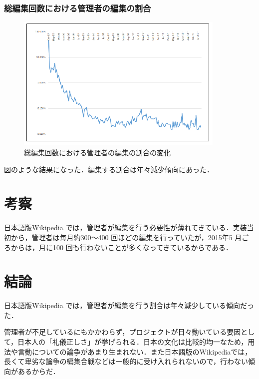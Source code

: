 \subsection{総編集回数における管理者の編集の割合}


\begin{figure}[H]
\centering
\includegraphics[width=10cm]{sysop_per.png}
\caption{総編集回数における管理者の編集の割合の変化}\label{サンプル図}
\end{figure}

図のような結果になった．編集する割合は年々減少傾向にあった．








\chapter{考察}

日本語版Wikipedia では，管理者が編集を行う必要性が薄れてきている．実装当初から，管理者は毎月約300～400 回ほどの編集を行っていたが，2015年5 月ごろからは，月に100 回も行わないことが多くなってきているからである．


\chapter{結論}

日本語版Wikipedia では，管理者が編集を行う割合は年々減少している傾向だった．

管理者が不足しているにもかかわらず，プロジェクトが日々動いている要因として，日本人の「礼儀正しさ」が挙げられる．日本の文化は比較的均一なため，用法や言動についての論争があまり生まれない．また日本語版のWikipediaでは，長くて卑劣な論争の編集合戦などは一般的に受け入れられないので，行わない傾向があるからだ．




